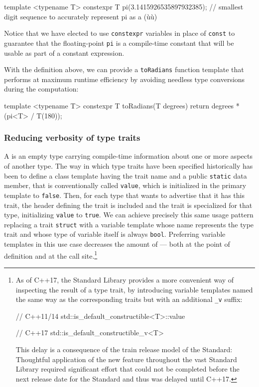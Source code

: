 \begin{emcppslisting}[language=C++]
template <typename T>
constexpr T pi(3.1415926535897932385);
    // smallest digit sequence to accurately represent pi as a (ù{}ù)
\end{emcppslisting}
    
\noindent Notice that we have elected to use \lstinline!constexpr! variables in place of  \lstinline!const! to guarantee that the floating-point \lstinline!pi! is a compile-time constant that will be usable as part of a constant expression.

With the definition above, we can provide a
\lstinline!toRadians! function template that performs at maximum runtime
efficiency by avoiding needless type conversions during the computation:

\begin{emcppslisting}[language=C++]
template <typename T>
constexpr T toRadians(T degrees)
{
    return degrees * (pi<T> / T(180));
}
\end{emcppslisting}
    

\subsubsection[Reducing verbosity of type traits]{Reducing verbosity of type traits}\label{reducing-verbosity-of-type-traits}

A  is an empty type carrying compile-time information
about one or more aspects of another type. The way in which type traits
have been specified historically has been to define a class template
having the trait name and a public \lstinline!static! 
data member, that is conventionally called \lstinline!value!, which is
initialized in the primary template to \lstinline!false!. Then, for each
type that wants to advertise that it has this trait, the header defining
the trait is included and the trait is specialized for that type,
initializing \lstinline!value! to \lstinline!true!. We can achieve precisely
this same usage pattern replacing a trait \lstinline!struct! with a
variable template whose name represents the type trait and whose type of
variable itself is always \lstinline!bool!. Preferring variable templates
in this use case decreases the amount of  ---
both at the point of definition and at the call
site.{\cprotect\footnote{As of C++17, the Standard Library provides a
more convenient way of inspecting the result of a type trait, by
introducing variable templates named the same way as the corresponding
traits but with an additional \lstinline!_v! suffix:

\begin{emcppslisting}[language=C++, style=footcode]
// C++11/14
std::is_default_constructible<T>::value

// C++17
std::is_default_constructible_v<T>
\end{emcppslisting}
This delay is a consequence of the train release model of the Standard: Thoughtful application of the new feature throughout the vast Standard Library required significant effort that could not be completed before the next release date for the Standard and thus was delayed until C++17.
      }}

